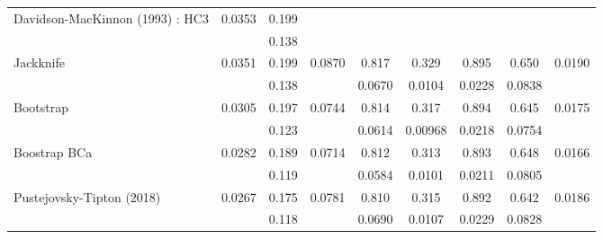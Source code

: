 \begin{tabular}{ccccccccc}
\midrule
\multicolumn{1}{l}{\multirow{2}[2]{*}{Davidson-MacKinnon (1993) : HC3}} & 0.0353 & 0.199 &       &       &       &       &       &  \\
      & \cellcolor[rgb]{ .851,  .851,  .851} & \cellcolor[rgb]{ .851,  .851,  .851}0.138 & \cellcolor[rgb]{ .851,  .851,  .851} & \cellcolor[rgb]{ .851,  .851,  .851} & \cellcolor[rgb]{ .851,  .851,  .851} & \cellcolor[rgb]{ .851,  .851,  .851} & \cellcolor[rgb]{ .851,  .851,  .851} & \cellcolor[rgb]{ .851,  .851,  .851} \\
\midrule
\multicolumn{1}{l}{\multirow{2}[2]{*}{Jackknife}} & 0.0351 & 0.199 & 0.0870 & 0.817 & 0.329 & 0.895 & 0.650 & 0.0190 \\
      & \cellcolor[rgb]{ .851,  .851,  .851} & \cellcolor[rgb]{ .851,  .851,  .851}0.138 & \cellcolor[rgb]{ .851,  .851,  .851} & \cellcolor[rgb]{ .851,  .851,  .851}0.0670 & \cellcolor[rgb]{ .851,  .851,  .851}0.0104 & \cellcolor[rgb]{ .851,  .851,  .851}0.0228 & \cellcolor[rgb]{ .851,  .851,  .851}0.0838 & \cellcolor[rgb]{ .851,  .851,  .851} \\
\midrule
\multicolumn{1}{l}{\multirow{2}[2]{*}{Bootstrap}} & 0.0305 & 0.197 & 0.0744 & 0.814 & 0.317 & 0.894 & 0.645 & 0.0175 \\
      & \cellcolor[rgb]{ .851,  .851,  .851} & \cellcolor[rgb]{ .851,  .851,  .851}0.123 & \cellcolor[rgb]{ .851,  .851,  .851} & \cellcolor[rgb]{ .851,  .851,  .851}0.0614 & \cellcolor[rgb]{ .851,  .851,  .851}0.00968 & \cellcolor[rgb]{ .851,  .851,  .851}0.0218 & \cellcolor[rgb]{ .851,  .851,  .851}0.0754 & \cellcolor[rgb]{ .851,  .851,  .851} \\
\midrule
\multicolumn{1}{l}{\multirow{2}[2]{*}{Boostrap BCa}} & 0.0282 & 0.189 & 0.0714 & 0.812 & 0.313 & 0.893 & 0.648 & 0.0166 \\
      & \cellcolor[rgb]{ .851,  .851,  .851} & \cellcolor[rgb]{ .851,  .851,  .851}0.119 & \cellcolor[rgb]{ .851,  .851,  .851} & \cellcolor[rgb]{ .851,  .851,  .851}0.0584 & \cellcolor[rgb]{ .851,  .851,  .851}0.0101 & \cellcolor[rgb]{ .851,  .851,  .851}0.0211 & \cellcolor[rgb]{ .851,  .851,  .851}0.0805 & \cellcolor[rgb]{ .851,  .851,  .851} \\
\midrule
\multicolumn{1}{l}{\multirow{2}[2]{*}{Pustejovsky-Tipton (2018)}} & 0.0267 & 0.175 & 0.0781 & 0.810 & 0.315 & 0.892 & 0.642 & 0.0186 \\
      & \cellcolor[rgb]{ .851,  .851,  .851} & \cellcolor[rgb]{ .851,  .851,  .851}0.118 & \cellcolor[rgb]{ .851,  .851,  .851} & \cellcolor[rgb]{ .851,  .851,  .851}0.0690 & \cellcolor[rgb]{ .851,  .851,  .851}0.0107 & \cellcolor[rgb]{ .851,  .851,  .851}0.0229 & \cellcolor[rgb]{ .851,  .851,  .851}0.0828 & \cellcolor[rgb]{ .851,  .851,  .851} \\

\end{tabular}
